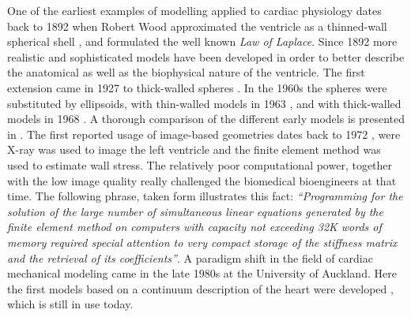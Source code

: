 One of the earliest examples of modelling applied to cardiac
physiology dates back to 1892 when Robert Wood approximated the
ventricle as a thinned-wall spherical shell \cite{woods1892few}, and
formulated the well known \emph{Law of Laplace}.
Since 1892 more realistic and sophisticated models have been developed
in order to better describe the anatomical as well as the biophysical
nature of the ventricle. The first extension came in 1927 to
thick-walled spheres \cite{love2013treatise}. In the 1960s the spheres
were substituted by ellipsoids, with thin-walled models in 1963
\cite{sandler1963left}, and with thick-walled models in 1968
\cite{wong1968stress}. A thorough comparison of the different early
models  is presented in \cite{huisman1980comparison}. The first
reported usage of image-based geometries dates back to 1972
\cite{gould1972vivo}, were X-ray was used to image the left ventricle
and the finite element method was used to estimate wall stress. The relatively
poor computational power, together with the low image quality really
challenged the biomedical bioengineers at that time. The following
phrase, taken form \cite{heethaar1977computer} illustrates this fact:  
\emph{``Programming for the solution of the large number of
  simultaneous linear equations generated by the finite element method
  on computers with capacity not exceeding 32K words of memory
  required special attention to very compact storage of the
  stiffness matrix and the retrieval of its coefficients''}.
A paradigm shift in the field of cardiac mechanical modeling came in
the late 1980s at the University of Auckland. Here the first models
based on a continuum description of the heart were developed
\cite{hunter1988analysis}, which is still in use today. 



